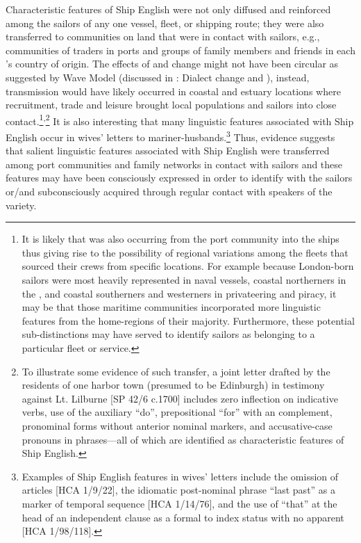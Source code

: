 Characteristic features of Ship English were not only diffused and reinforced among the sailors of any one vessel, fleet, or shipping route; they were also transferred to communities on land that were in contact with sailors, e.g., communities of traders in ports and groups of family members and friends in each ’s country of origin. The effects of  and change might not have been circular as suggested by  Wave Model (discussed in : Dialect change and ),  instead, transmission would have likely occurred in coastal and estuary locations where recruitment, trade and leisure brought local populations and sailors into close contact.\footnote{It is likely that  was also occurring from the port community into the ships thus giving rise to the possibility of regional variations among the fleets that sourced their crews from specific locations. For example because London{}-born sailors were most heavily represented in naval vessels, coastal northerners in the , and coastal southerners and westerners in privateering and piracy, it may be that those maritime communities incorporated more linguistic features from the home-regions of their  majority. Furthermore, these potential sub-distinctions may have served to identify sailors as belonging to a particular fleet or service.}\textsuperscript{,}\footnote{To illustrate some evidence of such transfer, a joint letter drafted by the residents of one harbor town (presumed to be Edinburgh) in testimony against Lt. Lilburne [SP 42/6 c.1700] includes zero inflection on  indicative verbs,  use of the auxiliary “do”, prepositional “for” with an  complement,  pronominal forms without anterior nominal markers, and accusative-case pronouns in  phrases—all of which are identified as characteristic features of Ship English.} It is also interesting that many linguistic features associated with Ship English occur in wives’ letters to mariner-husbands.\footnote{Examples of Ship English features in wives’ letters include the omission of articles [HCA 1/9/22], the idiomatic post-nominal phrase “last past” as a marker of temporal sequence [HCA 1/14/76], and the use of “that” at the head of an independent clause as a formal  to index status with no apparent  [HCA 1/98/118].} Thus, evidence suggests that salient linguistic features associated with Ship English were transferred among port communities and family networks in contact with sailors and these features may have been consciously expressed in order to identify with the sailors or/and subconsciously acquired through regular contact with speakers of the variety.  

